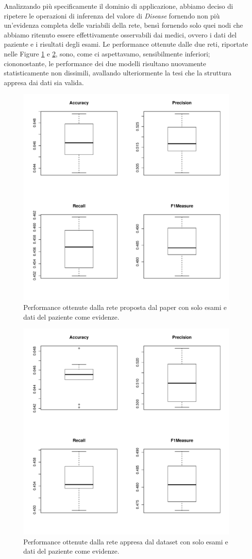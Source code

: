 Analizzando più specificamente il dominio di applicazione, abbiamo deciso di ripetere le operazioni di inferenza del valore di \textit{Disease} fornendo non più un'evidenza completa delle variabili della rete, bensì fornendo solo quei nodi che abbiamo ritenuto essere effettivamente osservabili dai medici, ovvero i dati del paziente e i risultati degli esami.
Le performance ottenute dalle due reti, riportate nelle Figure \ref{fig:paperperformancehalf} e \ref{fig:inducedperformancehalf}, sono, come ci aspettavamo, sensibilmente inferiori; ciononostante, le performance dei due modelli risultano nuovamente statisticamente non dissimili, avallando ulteriormente la tesi che la struttura appresa dai dati sia valida.
\begin{figure}
	\centering
	\includegraphics[width=0.7\linewidth]{images/paper_performance_half}
	\caption{Performance ottenute dalla rete proposta dal paper con solo esami e dati del paziente come evidenze.}
	\label{fig:paperperformancehalf}
\end{figure}
\begin{figure}
	\centering
	\includegraphics[width=0.7\linewidth]{images/induced_performance_half}
	\caption{Performance ottenute dalla rete appresa dal dataset con solo esami e dati del paziente come evidenze.}
	\label{fig:inducedperformancehalf}
\end{figure}

